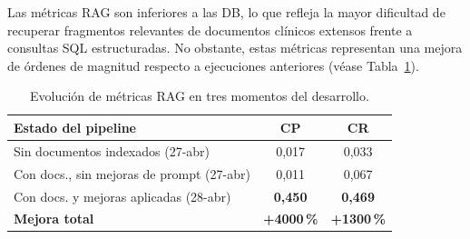 \documentclass[11pt,a4paper,twocolumn]{article}
\begin{document}
Las m\'{e}tricas RAG son inferiores a las DB, lo que refleja la mayor dificultad de recuperar fragmentos relevantes de documentos cl\'{i}nicos extensos frente a consultas SQL estructuradas. No obstante, estas m\'{e}tricas representan una mejora de \'{o}rdenes de magnitud respecto a ejecuciones anteriores (v\'{e}ase Tabla~\ref{tab:evolucion_rag}).

\begin{table}[H]
\centering
\caption{Evoluci\'{o}n de m\'{e}tricas RAG en tres momentos del desarrollo.}
\label{tab:evolucion_rag}
\footnotesize
\begin{tabularx}{\columnwidth}{Xcc}
\toprule
\textbf{Estado del pipeline} & \textbf{CP} & \textbf{CR} \\
\midrule
Sin documentos indexados (27-abr)          & 0,017 & 0,033 \\
Con docs., sin mejoras de prompt (27-abr)  & 0,011 & 0,067 \\
Con docs. y mejoras aplicadas (28-abr)     & \textcolor{success}{\textbf{0,450}} & \textcolor{success}{\textbf{0,469}} \\
\midrule
\textbf{Mejora total} & \textbf{+4000\,\%} & \textbf{+1300\,\%} \\
\bottomrule
\end{tabularx}
\end{table}
\end{document}
